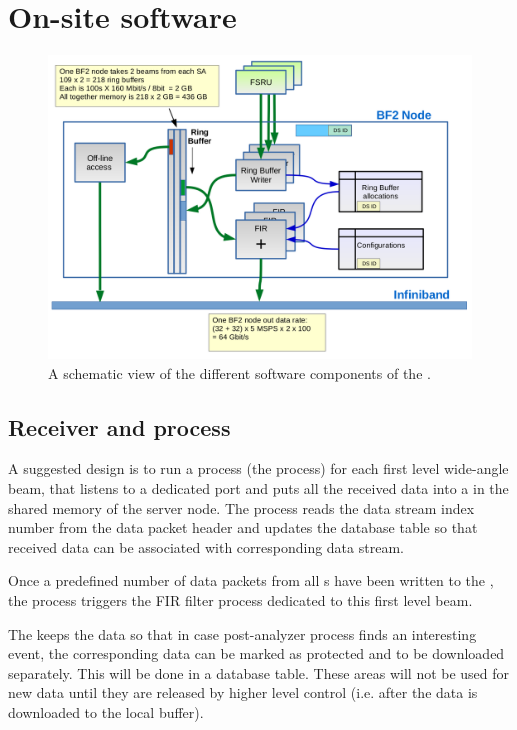 \documentclass[12pt,a4paper]{article}
\begin{document}
\section{On-site software}
\label{sec-onsite-sw}
\begin{figure}[!ht]
\centering
\includegraphics[width=\textwidth]{E3D_dataflow_g_4.png}
\caption{A schematic view of the different software components of the \SBF.}\label{fig:bf2node}
\end{figure}

\subsection{Receiver and \RB process}

A suggested design is to run a process (the \RB process) for each first level wide-angle beam, that listens to a dedicated port and puts all the received data into a \RB in the shared memory of the server node. 
The process reads the data stream index number from the data packet header and updates the \RB database table so that received data can be associated with corresponding data stream.

Once a predefined number of data packets from all \SA{}s have been written to the \RB, the process triggers the \SBF FIR filter process dedicated to this first level beam.

The \RB keeps the data so that in case post-analyzer process finds an interesting event, the corresponding data can be marked as protected and to be downloaded separately. 
This will be done in a database table. 
These \RB areas will not be used for new data until they are released by higher level control (i.e. after the data is downloaded to the local buffer).
\end{document}
